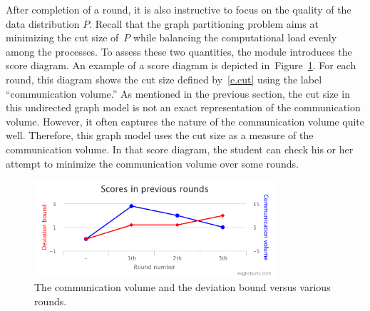 \documentclass[11pt, twoside,a4paper]{book}
\newcommand{\figref}[1]{Figure~\protect\ref{#1}}
\begin{document}
After completion of a round, it is also instructive to focus on the quality of the data
distribution $P$. Recall that the graph partitioning problem aims at minimizing the cut
size of~$P$ while balancing the computational load evenly among the processes. To assess
these two quantities, the module introduces the score diagram. An example of a score
diagram is depicted in~\figref{f.score}. For each round, this diagram shows the cut size
defined by~\eqref{e.cut} using the label ``communication volume.'' As mentioned in the
previous section, the cut size in this undirected graph model is not an exact
representation of the communication volume. However, it often captures the nature of the
communication volume quite well. Therefore, this graph model uses the cut size as a
measure of the communication volume. In that score diagram, the student can check his or
her attempt to minimize the communication volume over some rounds.

\begin{figure}
\centering
\includegraphics[width=0.8\textwidth]{chart}
\caption{The communication volume and the deviation bound versus various rounds.}
\label{f.score}
\end{figure}
\end{document}
